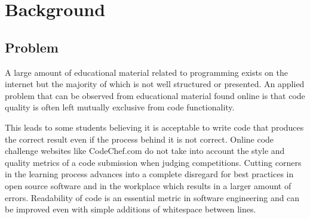 \documentclass{article}
\begin{document}


\begin{abstract} 
{\bf Discovering the effects of code style on code functionality and problem
structure.} This study aims to showcase how well formatted, reusable and
maintainable code is fundamentally better in all circumstances by
looking at over 1 million results from a competitive programming website
and analyzing the correlation between question and solution. The goal is
to promote code quality checking in online `just in time' teaching
resources to improve the performance of interviewers, researchers, and
students. \end{abstract} 


\section{Background}\label{background}

\subsection{Problem}\label{problem}

A large amount of educational material related to programming exists on
the internet but the majority of which is not well structured or
presented. An applied problem that can be observed from educational
material found online is that code quality is often left mutually
exclusive from code functionality. \citet{justintimeteaching}

This leads to some students believing it is acceptable to write code
that produces the correct result even if the process behind it is not
correct. Online code challenge websites like CodeChef.com do not take
into account the style and quality metrics of a code submission when
judging competitions. \citet{codechef} Cutting corners in the learning
process advances into a complete disregard for best practices in open
source software and in the workplace which results in a larger amount of
errors. Readability of code is an essential metric in software
engineering and can be improved even with simple additions of whitespace
between lines. \citet{codereadability}
\end{document}
